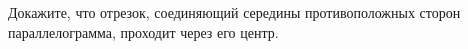 \begin{ex}
	\begin{condition}
		Докажите, что отрезок, соединяющий середины противоположных сторон параллелограмма, проходит через его центр.
	\end{condition}
\end{ex}